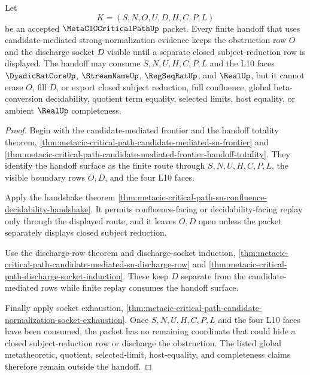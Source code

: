 \begin{theorem}
\label{thm:metacic-critical-path-candidate-mediated-frontier-obstruction-nonescape}
Let
$$
K=(S,N,O,U,D,H,C,P,L)
$$
be an accepted $\MetaCICCriticalPathUp$ packet. Every finite handoff that uses candidate-mediated strong-normalization evidence keeps the obstruction row $O$ and the discharge socket $D$ visible until a separate closed subject-reduction row is displayed. The handoff may consume $S,N,U,H,C,P,L$ and the L10 faces $\DyadicRatCoreUp$, $\StreamNameUp$, $\RegSeqRatUp$, and $\RealUp$, but it cannot erase $O$, fill $D$, or export closed subject reduction, full confluence, global beta-conversion decidability, quotient term equality, selected limits, host equality, or ambient $\RealUp$ completeness.
\end{theorem}
\begin{proof}
Begin with the candidate-mediated frontier and the handoff totality theorem, \autoref{thm:metacic-critical-path-candidate-mediated-sn-frontier} and \autoref{thm:metacic-critical-path-candidate-mediated-frontier-handoff-totality}. They identify the handoff surface as the finite route through $S,N,U,H,C,P,L$, the visible boundary rows $O,D$, and the four L10 faces.

Apply the handshake theorem \autoref{thm:metacic-critical-path-sn-confluence-decidability-handshake}. It permits confluence-facing or decidability-facing replay only through the displayed route, and it leaves $O,D$ open unless the packet separately displays closed subject reduction.

Use the discharge-row theorem and discharge-socket induction, \autoref{thm:metacic-critical-path-candidate-mediated-sn-discharge-row} and \autoref{thm:metacic-critical-path-discharge-socket-induction}. These keep $D$ separate from the candidate-mediated rows while finite replay consumes the handoff surface.

Finally apply socket exhaustion, \autoref{thm:metacic-critical-path-candidate-normalization-socket-exhaustion}. Once $S,N,U,H,C,P,L$ and the four L10 faces have been consumed, the packet has no remaining coordinate that could hide a closed subject-reduction row or discharge the obstruction. The listed global metatheoretic, quotient, selected-limit, host-equality, and completeness claims therefore remain outside the handoff.
\end{proof}

